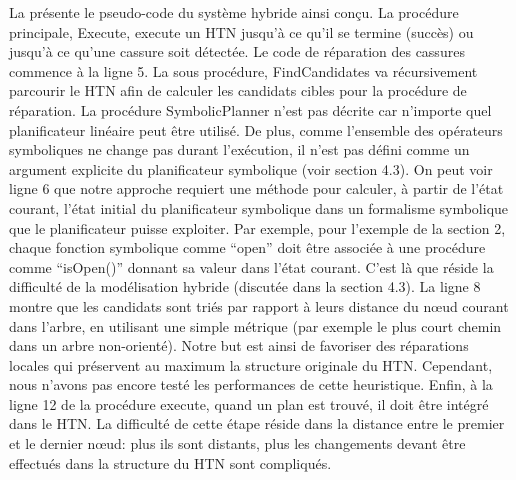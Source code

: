 \documentclass[a4paper,twoside,french]{article}
\begin{document}
			\par La  présente le pseudo-code du système hybride ainsi conçu. La procédure principale, {\sc Execute}, execute un HTN jusqu'à ce qu'il se termine (succès) ou jusqu'à ce qu'une cassure soit détectée. Le code de réparation des cassures commence à la ligne 5. La sous procédure, {\sc FindCandidates} va récursivement parcourir le HTN afin de calculer les candidats cibles pour la procédure de réparation. La procédure {\sc SymbolicPlanner} n'est pas décrite car n'importe quel planificateur linéaire peut être utilisé. De plus, comme l'ensemble des opérateurs symboliques ne change pas durant l'exécution, il n'est pas défini comme un argument explicite du planificateur symbolique (voir section 4.3). On peut voir ligne 6 que notre approche requiert une méthode pour calculer, à partir de l'état courant, l'état initial du planificateur symbolique dans un formalisme symbolique que le planificateur puisse exploiter. Par exemple, pour l'exemple de la section 2, chaque fonction symbolique comme ``open'' doit être associée à une procédure comme ``isOpen()'' donnant sa valeur dans l'état courant. C'est là que réside la difficulté de la modélisation hybride (discutée dans la section 4.3). La ligne 8 montre que les candidats sont triés par rapport à leurs distance du n\oe ud courant dans l'arbre, en utilisant une simple métrique (par exemple le plus court chemin dans un arbre non-orienté). Notre but est ainsi de favoriser des réparations locales qui préservent au maximum la structure originale du HTN. Cependant, nous n'avons pas encore testé les performances de cette heuristique. Enfin, à la ligne 12 de la procédure {\sc execute}, quand un plan est trouvé, il doit être intégré dans le HTN. La difficulté de cette étape réside dans la distance entre le premier et le dernier n\oe ud: plus ils sont distants, plus les changements devant être effectués dans la structure du HTN sont compliqués. 
\end{document}
